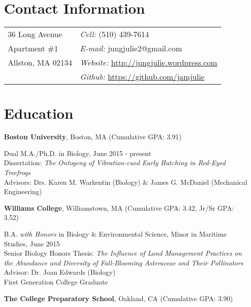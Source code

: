 \documentclass[margin,line]{res}
\begin{document}

\begin{resume}
\section{\sc Contact Information}
\vspace{.05in}
\begin{tabular}{@{}p{2in}p{4in}}
36 Long Avenue & {\it Cell:}  (510) 439-7614 \\  
Apartment \#1 & {\it E-mail:}  {\ttfamily jungjulie2@gmail.com} \\

Allston, MA 02134 & {\it Website:} \href{http://jungjulie.wordpress.com}{\ttfamily http://jungjulie.wordpress.com}\\       
& {\it Github:} \href{https://github.com/jamjulie}{\ttfamily https://github.com/jamjulie}\\     

\end{tabular}

\section{\sc Education}
{\bf Boston University}, Boston, MA (Cumulative GPA: 3.91)

\vspace*{-4mm}
Dual M.A./Ph.D. in Biology, June 2015 - present\\
Dissertation: {\it The Ontogeny of Vibration-cued Early Hatching in Red-Eyed Treefrogs}\\ 
Advisors: Drs. Karen M. Warkentin (Biology) \& James G. McDaniel (Mechanical Engineering)

{\bf Williams College}, Williamstown, MA (Cumulative GPA: 3.42, Jr/Sr GPA: 3.52)

\vspace*{-4mm}
B.A. {\it with Honors} in Biology \& Environmental Science, Minor in Maritime Studies, June 2015 \\
Senior Biology Honors Thesis: {\it The Influence of Land Management Practices on the Abundance and Diversity of Fall-Blooming Asteraceae and Their Pollinators}\\
Advisor: Dr. Joan Edwards (Biology)\\
First Generation College Graduate


{\bf The College Preparatory School}, Oakland, CA (Cumulative GPA: 3.90)


\end{resume}
\end{document}
